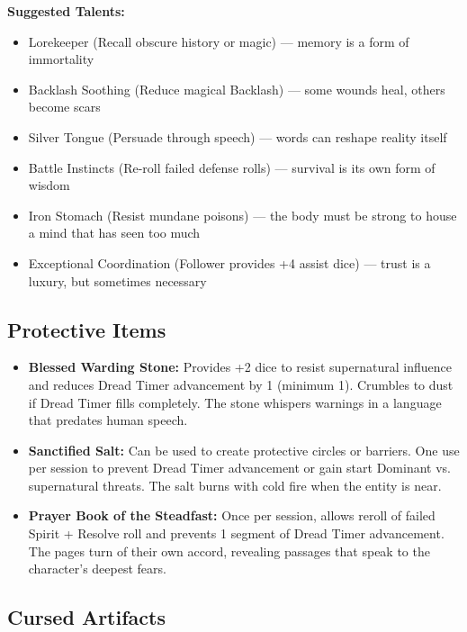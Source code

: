\documentclass[11pt]{article}
\begin{document}
\textbf{Suggested Talents:}
\begin{itemize}
\item Lorekeeper (Recall obscure history or magic) --- memory is a form of immortality
\item Backlash Soothing (Reduce magical Backlash) --- some wounds heal, others become scars
\item Silver Tongue (Persuade through speech) --- words can reshape reality itself
\item Battle Instincts (Re-roll failed defense rolls) --- survival is its own form of wisdom
\item Iron Stomach (Resist mundane poisons) --- the body must be strong to house a mind that has seen too much
\item Exceptional Coordination (Follower provides +4 assist dice) --- trust is a luxury, but sometimes necessary
\end{itemize}

\subsection{Protective Items}

\begin{itemize}
\item \textbf{Blessed Warding Stone:} Provides +2 dice to resist supernatural influence and reduces Dread Timer advancement by 1 (minimum 1). Crumbles to dust if Dread Timer fills completely. The stone whispers warnings in a language that predates human speech.
\item \textbf{Sanctified Salt:} Can be used to create protective circles or barriers. One use per session to prevent Dread Timer advancement or gain start Dominant vs. supernatural threats. The salt burns with cold fire when the entity is near.
\item \textbf{Prayer Book of the Steadfast:} Once per session, allows reroll of failed Spirit + Resolve roll and prevents 1 segment of Dread Timer advancement. The pages turn of their own accord, revealing passages that speak to the character's deepest fears.
\end{itemize}

\subsection{Cursed Artifacts}
\end{document}
